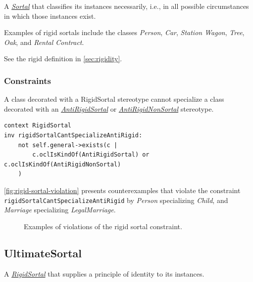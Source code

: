 A \hyperref[stereotype:sortal]{\textit{Sortal}} that classifies its instances necessarily, i.e., in all possible circumstances in which those instances exist.

Examples of rigid sortals include the classes \textit{Person}, \textit{Car}, \textit{Station Wagon}, \textit{Tree}, \textit{Oak}, and \textit{Rental Contract}.

See the rigid definition in \autoref{sec:rigidity}.

\subsubsection{Constraints}

\begin{constraint}
\label{constraint:rigidSortalCantSpecializeAntiRigid}
A class decorated with a RigidSortal stereotype cannot specialize a class decorated with an \hyperref[stereotype:antiRigidSortal]{\textit{AntiRigidSortal}} or \hyperref[stereotype:antiRigidNonSortal]{\textit{AntiRigidNonSortal}} stereotype. 

\begin{lstlisting}[language=OCL]
context RigidSortal 
inv rigidSortalCantSpecializeAntiRigid:
    not self.general->exists(c | 
        c.oclIsKindOf(AntiRigidSortal) or c.oclIsKindOf(AntiRigidNonSortal)
    )
\end{lstlisting}

\autoref{fig:rigid-sortal-violation} presents counterexamples that violate the constraint \texttt{rigidSortalCantSpecializeAntiRigid} by \textit{Person} specializing
\textit{Child}, and \textit{Marriage} specializing \textit{LegalMarriage}.

\begin{figure}[h]
    \centering
    
    \caption{Examples of violations of the rigid sortal constraint.}
    \label{fig:rigid-sortal-violation}
\end{figure}
\end{constraint}

\FloatBarrier

\subsection{UltimateSortal}
\label{stereotype:ultimateSortal}

A \hyperref[stereotype:rigidSortal]{\textit{RigidSortal}} that supplies a principle of identity to its instances.

